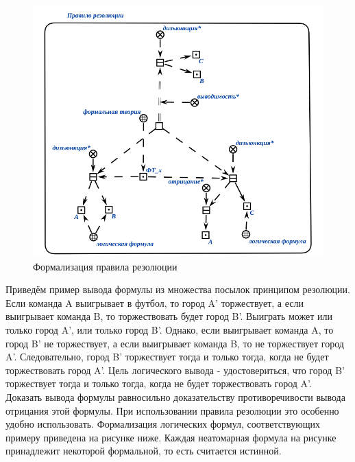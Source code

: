 \begin{figure}[H]
	\includegraphics[scale=0.8]{author/part3/figures/resolution.png}
	\caption{Формализация правила резолюции}
	\label{fig:resolution}
\end{figure}

Приведём пример вывода формулы из множества посылок принципом резолюции.
Если команда A выигрывает в футбол, то город A' торжествует, а если выигрывает команда B, то торжествовать будет город B'. Выиграть может или только город A', или только город B'. Однако, если выигрывает команда A, то город B' не торжествует, а если выигрывает команда B, то не торжествует город A'. Следовательно, город B' торжествует тогда и только тогда, когда не будет торжествовать город A'. Цель логического вывода - удостовериться, что город B' торжествует тогда и только тогда, когда не будет торжествовать город A'. Доказать вывода формулы равносильно доказательству противоречивости вывода отрицания этой формулы. При использовании правила резолюции это особенно удобно использовать.
Формализация логических формул, соответствующих примеру приведена на рисунке ниже. Каждая неатомарная формула на рисунке принадлежит некоторой формальной, то есть считается истинной.

